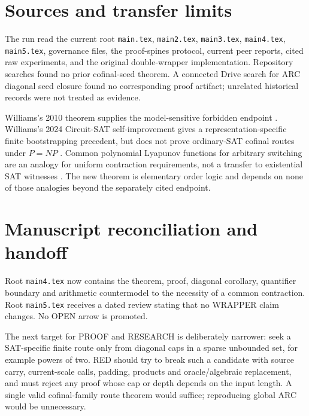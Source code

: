\documentclass[11pt]{article}
\begin{document}
\section*{Sources and transfer limits}
The run read the current root \texttt{main.tex}, \texttt{main2.tex},
\texttt{main3.tex}, \texttt{main4.tex}, \texttt{main5.tex}, governance files,
the proof-spines protocol, current peer reports, cited raw experiments, and
the original double-wrapper implementation.  Repository searches found no
prior cofinal-seed theorem.  A connected Drive search for ARC diagonal seed
closure found no corresponding proof artifact; unrelated historical records
were not treated as evidence.

Williams's 2010 theorem supplies the model-sensitive forbidden endpoint
\cite{williams2010}.  Williams's 2024 Circuit-SAT self-improvement gives a
representation-specific finite bootstrapping precedent, but does not prove
ordinary-SAT cofinal routes under $P=NP$ \cite{williams2024}.  Common
polynomial Lyapunov functions for arbitrary switching are an analogy for
uniform contraction requirements, not a transfer to existential SAT witnesses
\cite{mason2004}.  The new theorem is elementary order logic and depends on
none of those analogies beyond the separately cited endpoint.

\section*{Manuscript reconciliation and handoff}
Root \texttt{main4.tex} now contains the theorem, proof, diagonal corollary,
quantifier boundary and arithmetic countermodel to the necessity of a common
contraction.  Root \texttt{main5.tex} receives a dated review stating that no
WRAPPER claim changes.  No OPEN arrow is promoted.

The next target for PROOF and RESEARCH is deliberately narrower: seek a
SAT-specific finite route only from diagonal caps in a sparse unbounded set,
for example powers of two.  RED should try to break such a candidate with
source carry, current-scale calls, padding, products and oracle/algebraic
replacement, and must reject any proof whose cap or depth depends on the input
length.  A single valid cofinal-family route theorem would suffice; reproducing
global ARC would be unnecessary.



\end{document}
